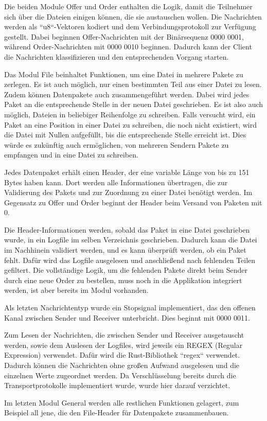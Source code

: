 Die beiden Module Offer und Order enthalten die Logik, damit die Teilnehmer sich über die Dateien einigen können, die sie austauschen wollen.
Die Nachrichten werden als “u8“-Vektoren kodiert und dem Verbindungsprotokoll zur Verfügung gestellt. Dabei beginnen Offer-Nachrichten mit der Binärsequenz 0000 0001, während Order-Nachrichten mit 0000 0010 beginnen.
Dadurch kann der Client die Nachrichten klassifizieren und den entsprechenden Vorgang starten.

Das Modul File beinhaltet Funktionen, um eine Datei in mehrere Pakete zu zerlegen. Es ist auch möglich, nur einen bestimmten Teil aus einer Datei zu lesen.
Zudem können Datenpakete auch zusammengeführt werden. Dabei wird jedes Paket an die entsprechende Stelle in der neuen Datei geschrieben. Es ist also auch möglich, Dateien in beliebiger Reihenfolge zu schreiben. Falls versucht wird, ein Paket an eine Position in einer Datei zu schreiben, die noch nicht existiert, wird die Datei mit Nullen aufgefüllt, bis die entsprechende Stelle erreicht ist.
Dies würde es zukünftig auch ermöglichen, von mehreren Sendern Pakete zu empfangen und in eine Datei zu schreiben.

Jedes Datenpaket erhält einen Header, der eine variable Länge von bis zu 151 Bytes haben kann. Dort werden alle Informationen übertragen, die zur Validierung des Pakets und zur Zuordnung zu einer Datei benötigt werden.
Im Gegensatz zu Offer und Order beginnt der Header beim Versand von Paketen mit 0.

Die Header-Informationen werden, sobald das Paket in eine Datei geschrieben wurde, in ein Logfile im selben Verzeichnis geschrieben. Dadurch kann die Datei im Nachhinein validiert werden, und es kann überprüft werden, ob ein Paket fehlt. Dafür wird das Logfile ausgelesen und anschließend nach fehlenden Teilen gefiltert.
Die vollständige Logik, um die fehlenden Pakete direkt beim Sender durch eine neue Order zu bestellen, muss noch in die Applikation integriert werden, ist aber bereits im Modul vorhanden.

Als letzten Nachrichtentyp wurde ein Stopsignal implementiert, das den offenen Kanal zwischen Sender und Receiver unterbricht. Dies beginnt mit 0000 0011.

Zum Lesen der Nachrichten, die zwischen Sender und Receiver ausgetauscht werden, sowie dem Auslesen der Logfiles, wird jeweils ein REGEX (Regular Expression) verwendet. Dafür wird die Rust-Bibliothek “regex“ verwendet.
Dadurch können die Nachrichten ohne großen Aufwand ausgelesen und die einzelnen Werte zugeordnet werden.
Da Verschlüsselung bereits durch die Transportprotokolle implementiert wurde, wurde hier darauf verzichtet.

Im letzten Modul General werden alle restlichen Funktionen gelagert, zum Beispiel all jene, die den File-Header für Datenpakete zusammenbauen.
